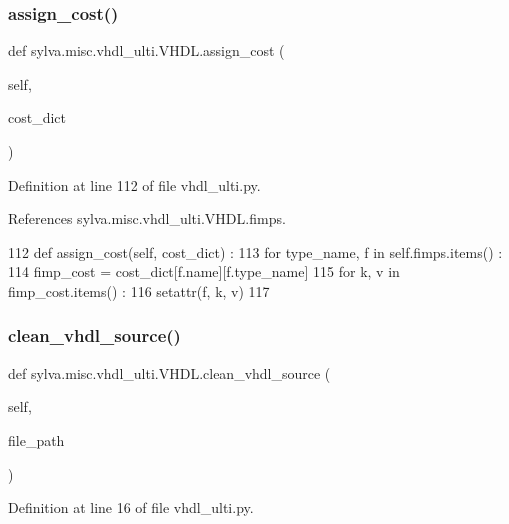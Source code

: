\subsubsection{\texorpdfstring{assign\+\_\+cost()}{assign\_cost()}}
{\footnotesize\ttfamily def sylva.\+misc.\+vhdl\+\_\+ulti.\+V\+H\+D\+L.\+assign\+\_\+cost (\begin{DoxyParamCaption}\item[{}]{self,  }\item[{}]{cost\+\_\+dict }\end{DoxyParamCaption})}



Definition at line 112 of file vhdl\+\_\+ulti.\+py.



References sylva.\+misc.\+vhdl\+\_\+ulti.\+V\+H\+D\+L.\+fimps.


\begin{DoxyCode}
112   \textcolor{keyword}{def }assign\_cost(self, cost\_dict) :
113     \textcolor{keywordflow}{for} type\_name, f \textcolor{keywordflow}{in} self.fimps.items() :
114       fimp\_cost = cost\_dict[f.name][f.type\_name]
115       \textcolor{keywordflow}{for} k, v \textcolor{keywordflow}{in} fimp\_cost.items() :
116         setattr(f, k, v)
117 
\end{DoxyCode}
\mbox{\label{classsylva_1_1misc_1_1vhdl__ulti_1_1_v_h_d_l_a9069beffb43ba444c7aa61902dcff236}} 
\subsubsection{\texorpdfstring{clean\+\_\+vhdl\+\_\+source()}{clean\_vhdl\_source()}}
{\footnotesize\ttfamily def sylva.\+misc.\+vhdl\+\_\+ulti.\+V\+H\+D\+L.\+clean\+\_\+vhdl\+\_\+source (\begin{DoxyParamCaption}\item[{}]{self,  }\item[{}]{file\+\_\+path }\end{DoxyParamCaption})}



Definition at line 16 of file vhdl\+\_\+ulti.\+py.


